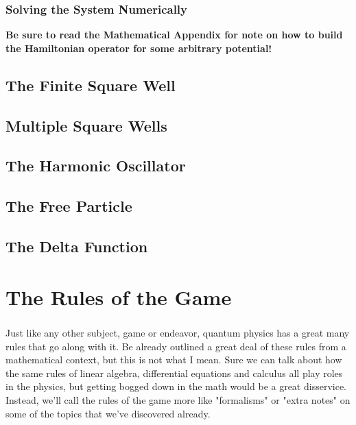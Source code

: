 \documentclass[12pt,letterpaper]{book}
\begin{document}

\subsection*{Solving the System Numerically}
\textbf{Be sure to read the Mathematical Appendix for note on how to build the Hamiltonian operator for some arbitrary potential!}



\section{The Finite Square Well}


\section{Multiple Square Wells}



\section{The Harmonic Oscillator}



\section{The Free Particle}



\section{The Delta Function}





\chapter{The Rules of the Game}

\paragraph*{}Just like any other subject, game or endeavor, quantum physics has a great many rules that go along with it. Be already outlined a great deal of these rules from a mathematical context, but this is not what I mean. Sure we can talk about how the same rules of linear algebra, differential equations and calculus all play roles in the physics, but getting bogged down in the math would be a great disservice. Instead, we'll call the rules of the game more like "formalisms" or "extra notes" on some of the topics that we've discovered already.
\end{document}
